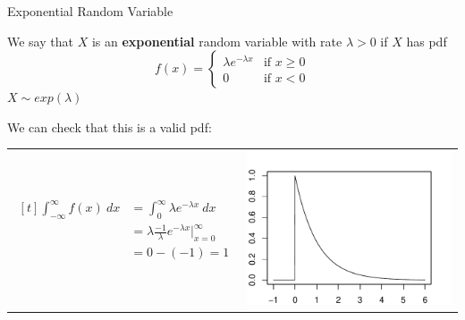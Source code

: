 \documentclass[handout]{beamer}
\begin{document}
\begin{frame}{Exponential Random Variable}
    \begin{block}{}
        We say that $X$ is an \textbf{exponential} random variable with rate $\lambda>0$ if $X$ has pdf
        $$f(x) = \begin{cases}\lambda e^{-\lambda x} & \text{if }x\geq 0 \\ 0 & \text{if }x<0\end{cases}$$
        $X \sim exp(\lambda)$
    \end{block}
    \pause We can check that this is a valid pdf:

    \begin{tabular}{p{5.5cm}p{4cm}}
        \vspace{0cm}
        $\begin{aligned}[t]
                \int_{-\infty}^\infty f(x)\ dx & = \int_0^\infty \lambda e^{-\lambda x}\ dx                      \\
                                               & = \lambda \frac{-1}\lambda e^{-\lambda x}\Big\vert_{x=0}^\infty \\
                                               & = 0 - (-1) = 1
            \end{aligned}$
         &
        \vspace{-.25cm}
        \includegraphics[scale=.55]{ch4_pdf_exp.pdf}
    \end{tabular}
\end{frame}
\end{document}
